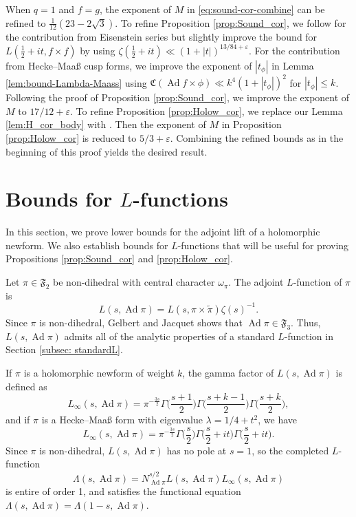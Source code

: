 \documentclass[12pt,reqno]{amsart}
\theoremstyle{remark}
\DeclareMathOperator{\ad}{Ad}
\numberwithin{equation}{section}
\begin{document}
     When $q=1$ and $f=g$, the exponent of $M$ in \eqref{eq:sound-cor-combine} can be refined to $\tfrac{1}{12}(23-2\sqrt{3})$. To refine Proposition \ref{prop:Sound_cor}, we follow \cite[Lemma 4.4]{LMR} for the contribution from Eisenstein series but slightly improve the bound for $L(\frac{1}{2}+it, f \times f)$ by using $\zeta(\frac{1}{2}+it) \ll (1+|t|)^{13/84+\varepsilon}$.  For the contribution from Hecke--Maa{\ss} cusp forms, we improve the exponent of $|t_\phi|$ in Lemma \ref{lem:bound-Lambda-Maass} using $\mathfrak{C}(\ad f \times \phi) \ll k^4(1+|t_\phi|)^2$ for $|t_\phi| \le k$. Following the proof of Proposition \ref{prop:Sound_cor}, we improve the exponent of $M$ to $17/12+\varepsilon$.
     To refine Proposition \ref{prop:Holow_cor}, we replace our Lemma \ref{lem:H_cor_body} with \cite[Lemma 4.5]{LMR}. Then  the exponent of $M$ in Proposition \ref{prop:Holow_cor} is reduced to $5/3+\varepsilon$.
     Combining the refined bounds as in the beginning of this proof yields the desired result. 
  
    
    
    \section{Bounds for \texorpdfstring{$L$}{L}-functions}\label{sec:Bound-L-functions}

      In this section, we prove lower bounds for the adjoint lift of a holomorphic newform. We also establish bounds for $L$-functions that will be useful for proving Propositions \ref{prop:Sound_cor} and \ref{prop:Holow_cor}.
     
     Let $\pi \in \mathfrak{F}_2$ be non-dihedral with central character $\omega_{\pi}$. The adjoint $L$-function of $\pi$ is
    \[
        L(s, \ad \pi) = L(s, \pi \times \widetilde{\pi}) \zeta(s)^{-1}.
    \]
    Since $\pi$ is non-dihedral, Gelbert and Jacquet \cite{GJ} shows that  $\ad \pi \in \mathfrak{F}_3$. Thus, $L(s, \ad \pi)$ admits all of the analytic properties of a standard $L$-function in Section \ref{subsec: standardL}.  
    
    If $\pi$ is a holomorphic newform of weight $k$, the gamma factor of $L(s, \ad \pi)$ is defined as 
    \[
        L_{\infty}(s, \ad \pi) = \pi^{-\frac{3s}{2}}\Gamma\Big(\frac{s+1}{2}\Big)\Gamma\Big(\frac{s+k-1}{2}\Big)\Gamma\Big(\frac{s+k}{2}\Big),
    \]
    and if $\pi$ is a Hecke--Maa{\ss} form with eigenvalue $\lambda = 1/4+t^2$, we have
     \[
        L_{\infty}(s, \ad \pi) = \pi^{-\frac{3s}{2}}\Gamma\Big(\frac{s}{2}\Big)\Gamma\Big(\frac{s}{2}+it\Big)\Gamma\Big(\frac{s}{2}+it\Big).
    \]
    Since $\pi$ is non-dihedral, $L(s, \ad \pi)$ has no pole at $s=1$, so the completed $L$-function
    \[
        \Lambda(s,\ad \pi) = N_{\ad \pi}^{s/2}L(s, \ad \pi)L_{\infty}(s, \ad \pi)
    \]
    is entire of order 1, and satisfies the functional equation $\Lambda(s, \ad \pi) = \Lambda(1-s, \ad \pi)$. 
    
\end{document}
